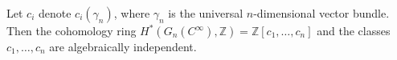 Let $c_i$ denote $c_i(\gamma_n)$, where $\gamma_n$ is the universal $n$-dimensional vector bundle. Then the cohomology ring $H^*(G_n(C^\infty), \mathbb{Z}) = \mathbb{Z}[c_1, \dots, c_n]$ and the classes $c_1, \dots, c_n$ are algebraically independent.
